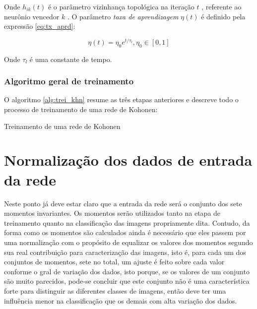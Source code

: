 Onde $ h_{ik}(t) $ é o parâmetro vizinhança topológica na iteração $ t $ ,
referente ao neurônio vencedor $ k $ . O
parâmetro \textit{taxa de aprendizagem} $ \eta(t) $ é definido pela
expressão \ref{eq:tx_aprd}:

\begin{equation}\label{eq:tx_aprd}
  \eta(t) = \eta_0 e^{ t / \tau_l }, \eta_0 \in [0, 1]
\end{equation}

Onde $ \tau_l $ é uma constante de tempo.

\subsubsection{Algoritmo geral de treinamento}

O algoritmo \ref{alg:trei_khn} resume as três etapas anteriores e descreve
todo o processo de treinamento de uma rede de Kohonen:

\begin{algorithm}[H]
\caption{Treinamento de uma rede de Kohonen}\label{alg:trei_khn}
\end{algorithm}

\section{Normalização dos dados de entrada da rede}\label{sec:entrada_rede}

Neste ponto já deve estar claro que a entrada da rede será o conjunto dos sete
momentos invariantes. Os momentos serão utilizados tanto na etapa de treinamento
quanto na classificação das imagens propriamente dita. Contudo, da forma como os
momentos são calculados ainda é necessário que eles passem por uma normalização
com o propósito de equalizar os valores dos momentos segundo sua real
contribuição para caracterização das imagens, isto é, para cada um dos conjuntos
de momentos, sete no total, um ajuste é feito sobre cada valor conforme o gral de
variação dos dados, isto porque, se os valores de um conjunto são muito
parecidos, pode-se concluir que este conjunto não é uma característica forte
para distinguir as diferentes classes de imagens, então deve ter uma influência
menor na classificação que os demais com alta variação dos dados.

